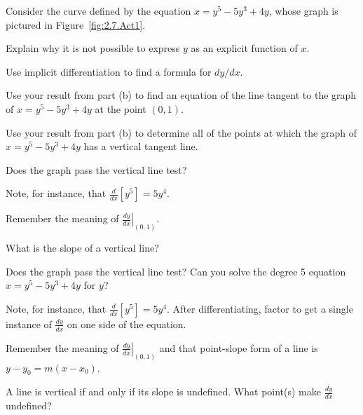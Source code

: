 \begin{activity} \label{A:2.7.1}  
Consider the curve defined by the equation $x = y^5 - 5y^3 + 4y$, whose graph is pictured in Figure~\ref{fig:2.7.Act1}.

\ba
	\item Explain why it is not possible to express $y$ as an explicit function of $x$.

	\item Use implicit differentiation to find a formula for $dy/dx$.

	\item Use your result from part (b) to find an equation of the line tangent to the graph of $x = y^5 -
5y^3 + 4y$ at the point $(0, 1)$.

	\item Use your result from part (b) to determine all of the points at
which the graph of $x = y^5 - 5y^3 + 4y$ has a vertical tangent
line.
\ea
\end{activity}
\begin{smallhint}
\ba
	\item Does the graph pass the vertical line test?
	\item Note, for instance, that $\frac{d}{dx}[y^5] = 5y^4$.
	\item Remember the meaning of $\left. \frac{dy}{dx} \right|_{(0,1)}$.
	\item What is the slope of a vertical line?
\ea
\end{smallhint}
\begin{bighint}
\ba
	\item Does the graph pass the vertical line test?  Can you solve the degree 5 equation $x = y^5 - 5y^3 + 4y$ for $y$?
	\item Note, for instance, that $\frac{d}{dx}[y^5] = 5y^4$.  After differentiating, factor to get a single instance of $\frac{dy}{dx}$ on one side of the equation.
	\item Remember the meaning of $\left. \frac{dy}{dx} \right|_{(0,1)}$ and that point-slope form of a line is $y - y_0 = m(x-x_0)$.
	\item A line is vertical if and only if its slope is undefined.  What point(s) make $\frac{dy}{dx}$ undefined?
\ea
\end{bighint}
